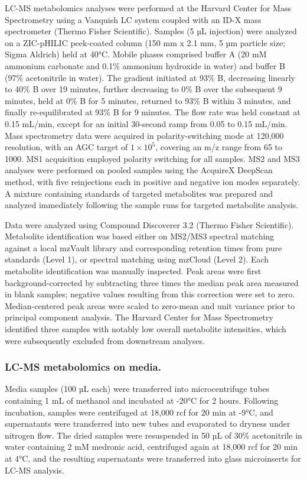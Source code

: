 LC-MS metabolomics analyses were performed at the Harvard Center for Mass Spectrometry using a Vanquish LC system coupled with an ID-X mass spectrometer (Thermo Fisher Scientific). Samples (5 µL injection) were analyzed on a ZIC-pHILIC peek-coated column (150 mm x 2.1 mm, 5 µm particle size; Sigma Aldrich) held at 40°C. Mobile phases comprised buffer A (20 mM ammonium carbonate and 0.1\% ammonium hydroxide in water) and buffer B (97\% acetonitrile in water). The gradient initiated at 93\% B, decreasing linearly to 40\% B over 19 minutes, further decreasing to 0\% B over the subsequent 9 minutes, held at 0\% B for 5 minutes, returned to 93\% B within 3 minutes, and finally re-equilibrated at 93\% B for 9 minutes. The flow rate was held constant at 0.15 mL/min, except for an initial 30-second ramp from 0.05 to 0.15 mL/min. Mass spectrometry data were acquired in polarity-switching mode at 120,000 resolution, with an AGC target of $1 \times 10^5$, covering an m/z range from 65 to 1000. MS1 acquisition employed polarity switching for all samples. MS2 and MS3 analyses were performed on pooled samples using the AcquireX DeepScan method, with five reinjections each in positive and negative ion modes separately. A mixture containing standards of targeted metabolites was prepared and analyzed immediately following the sample runs for targeted metabolite analysis.

Data were analyzed using Compound Discoverer 3.2 (Thermo Fisher Scientific). Metabolite identification was based either on MS2/MS3 spectral matching against a local mzVault library and corresponding retention times from pure standards (Level 1), or spectral matching using mzCloud (Level 2). Each metabolite identification was manually inspected. Peak areas were first background-corrected by subtracting three times the median peak area measured in blank samples; negative values resulting from this correction were set to zero. Median-centered peak areas were scaled to zero-mean and unit variance prior to principal component analysis. The Harvard Center for Mass Spectrometry identified three samples with notably low overall metabolite intensities, which were subsequently excluded from downstream analyses.

\subsubsection{LC-MS metabolomics on media.}
Media samples (100 µL each) were transferred into microcentrifuge tubes containing 1 mL of methanol and incubated at -20°C for 2 hours. Following incubation, samples were centrifuged at 18,000 rcf for 20 min at -9°C, and supernatants were transferred into new tubes and evaporated to dryness under nitrogen flow. The dried samples were resuspended in 50 µL of 30\% acetonitrile in water containing 2 mM medronic acid, centrifuged again at 18,000 rcf for 20 min at 4°C, and the resulting supernatants were transferred into glass microinserts for LC-MS analysis.


